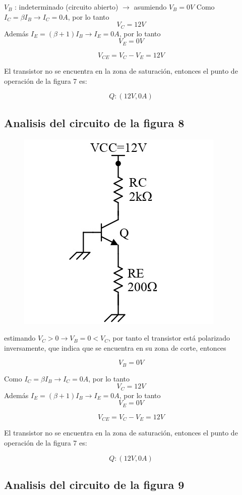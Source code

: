\documentclass[10pt, a4paper]{article}
\begin{document}
    $V_B$ : indeterminado (circuito abierto) $\rightarrow$ asumiendo $V_B = 0V$
    Como $I_C = \beta I_B \longrightarrow I_C = 0A$, por lo tanto
    $$V_C = 12V$$
    Además $I_E = (\beta + 1)I_B \longrightarrow I_E = 0A$, por lo tanto
    $$V_E = 0V$$

    $$V_{CE} = V_C - V_E = 12V$$

    El transistor no se encuentra en la zona de saturación, entonces el punto de operación de la figura 7 es:

    $$Q : (12V, 0A)$$

    \subsection{Analisis del circuito de la figura 8}

    \begin{figure}[h!]
        \centering
        \includegraphics[height=5cm\textwidth]{circuito2.jpg}
    \end{figure}

    estimando $V_C > 0 \rightarrow V_B = 0 < V_C$, por tanto el transistor está polarizado inversamente, que indica que se encuentra en su zona de corte, entonces

    $$V_B = 0V$$

    Como $I_C = \beta I_B \longrightarrow I_C = 0A$, por lo tanto
    $$V_C = 12V$$
    Además $I_E = (\beta + 1)I_B \longrightarrow I_E = 0A$, por lo tanto
    $$V_E = 0V$$

    $$V_{CE} = V_C - V_E = 12V$$

    El transistor no se encuentra en la zona de saturación, entonces el punto de operación de la figura 7 es:

    $$Q : (12V, 0A)$$

    \subsection{Analisis del circuito de la figura 9}
\end{document}
